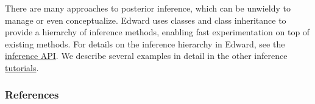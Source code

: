 There are many approaches to posterior inference, which can be unwieldy to
manage or even conceptualize. Edward uses classes and class
inheritance to provide a hierarchy of inference methods, enabling fast
experimentation on top of existing methods. For details on the inference
hierarchy in Edward, see the
\href{/api/inference}{inference API}. We describe several examples in
detail in the other inference \href{/tutorials/}{tutorials}.


\subsubsection{References}\label{references}

